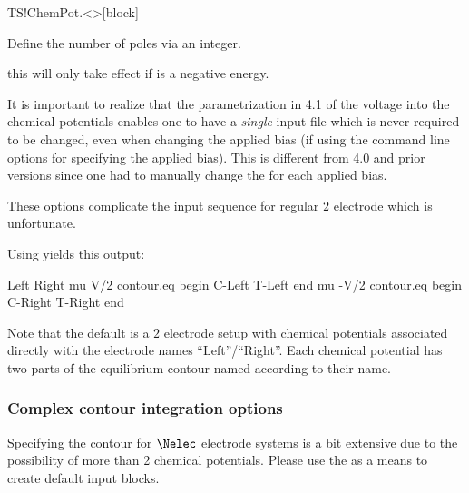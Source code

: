 \begin{fdfentry}{TS!ChemPot.<>}[block]
\begin{fdfoptions}

    Define the number of poles via an integer.
    
    \note this will only take effect if
     is a negative energy. 

  \end{fdfoptions}

  \note It is important to realize that the parametrization in 4.1 of
  the voltage into the chemical potentials enables one to have a
  \emph{single} input file which is never required to be changed, even
  when changing the applied bias (if using the command line options
  for specifying the applied bias).
  This is different from 4.0 and prior versions since one had to
  manually change the  for each applied
  bias.

\end{fdfentry}

These options complicate the input sequence for regular $2$ electrode
which is unfortunate. 

Using  yields this output:
\begin{fdfexample}
    Left
    Right
    mu V/2
    contour.eq
      begin
        C-Left
        T-Left
      end
    mu -V/2
    contour.eq
      begin
        C-Right
        T-Right
      end
\end{fdfexample}

Note that the default is a $2$ electrode setup with chemical
potentials associated directly with the electrode names
``Left''/``Right''. Each chemical potential has two parts of the
equilibrium contour named according to their name.



\subsubsection{Complex contour integration options}

Specifying the contour for $\Nelec$ electrode systems is a bit
extensive due to the possibility of more than 2 chemical
potentials. Please use the  as a means to
create default input blocks.

